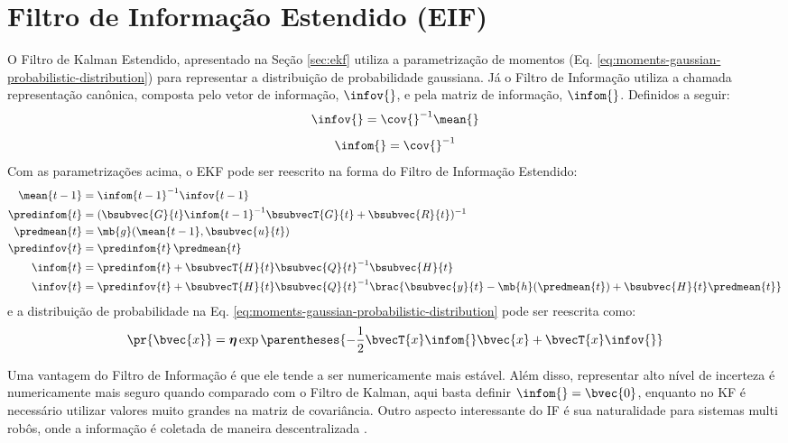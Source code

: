 \section{Filtro de Informação Estendido (EIF)}
O Filtro de Kalman Estendido, apresentado na Seção \ref{sec:ekf} utiliza a
parametrização de momentos (Eq. \ref{eq:moments-gaussian-probabilistic-distribution}) para representar a 
distribuição de probabilidade 
gaussiana. Já o Filtro de Informação utiliza a chamada representação canônica, composta pelo vetor de informação, $\infov{}$, e pela matriz de informação, $\infom{}$. Definidos a seguir:
\newcommand{\ifcorrespondence}{\infov{} = \cov{}^{-1} \mean{}}
\begin{equation}
  \ifcorrespondence 
  \label{eq:info-vector}
\end{equation}
\begin{equation}
  \infom{} = \cov{}^{-1}
  \label{eq:info-matrix}
\end{equation}
Com as parametrizações acima, o EKF pode ser reescrito na forma do Filtro de 
Informação Estendido:
\begin{align}
  \mean{t-1} &= \infom{t-1}^{-1} \infov{t-1}
  \label{eq:eif-mean-recuperation} \\
  \predinfom{t} &= (\bsubvec{G}{t} \infom{t-1}^{-1} \bsubvecT{G}{t} + \bsubvec{R}{t})^{-1}
  \label{eq:eif-info-matrix-prediction}\\
  \predmean{t} &= \mb{g}(\mean{t-1}, \bsubvec{u}{t})
  \label{eq:eif-mean-prediction} \\
  \predinfov{t} &= \predinfom{t}\,\predmean{t}
  \label{eq:eif-info-vector-prediction} \\
  \infom{t} &= \predinfom{t} + \bsubvecT{H}{t} \bsubvec{Q}{t}^{-1} \bsubvec{H}{t}
  \label{eq:eif-info-matrix-update} \\
  \infov{t} &= \predinfov{t} + \bsubvecT{H}{t}\bsubvec{Q}{t}^{-1} 
  \brac{\bsubvec{y}{t} - \mb{h}(\predmean{t}) + \bsubvec{H}{t}\predmean{t}}
  \label{eq:eif-info-vector-update}
\end{align}
e a distribuição de probabilidade na Eq. \ref{eq:moments-gaussian-probabilistic-distribution} pode ser reescrita como:
\begin{equation}
  \pr{\bvec{x}} = \boldsymbol{\eta} \exp\parentheses{-\frac{1}{2} 
  \bvecT{x} \infom{} \bvec{x} + \bvecT{x}\infov{}}
  \label{eq:canonical-gaussian-probabilistic-distribution}
\end{equation}

Uma vantagem do Filtro de Informação é que ele tende a ser numericamente mais estável. Além disso, 
representar alto nível de incerteza é numericamente mais seguro quando comparado 
com o Filtro de Kalman, aqui basta definir $\infom{} = \bvec{0}$, enquanto no KF 
é necessário utilizar valores muito grandes na matriz de covariância. Outro 
aspecto interessante do IF é sua naturalidade para sistemas multi robôs, onde a 
informação é coletada de maneira descentralizada \cite[p.~78]{bongard2006probabilistic}.

